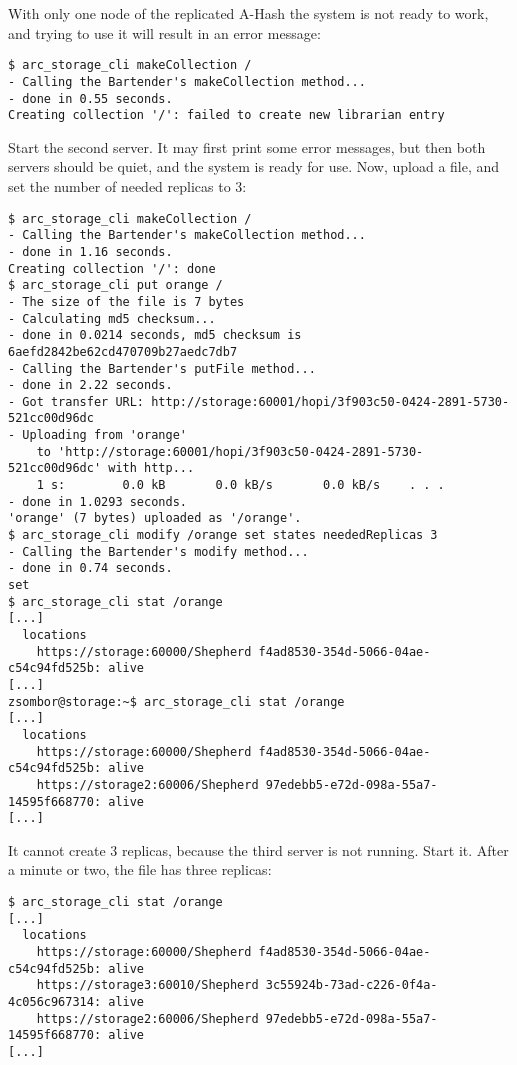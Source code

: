 \documentclass{article}
\begin{document}
With only one node of the replicated A-Hash the system is not ready to work, and trying to use it will result in an error message:
\begin{verbatim}
$ arc_storage_cli makeCollection /
- Calling the Bartender's makeCollection method...
- done in 0.55 seconds.
Creating collection '/': failed to create new librarian entry
\end{verbatim}

Start the second server. It may first print some error messages, but then both servers should be quiet, and the system is ready for use. Now, upload a file, and set the number of needed replicas to 3:

\begin{verbatim}
$ arc_storage_cli makeCollection /
- Calling the Bartender's makeCollection method...
- done in 1.16 seconds.
Creating collection '/': done
$ arc_storage_cli put orange /
- The size of the file is 7 bytes
- Calculating md5 checksum...
- done in 0.0214 seconds, md5 checksum is 6aefd2842be62cd470709b27aedc7db7
- Calling the Bartender's putFile method...
- done in 2.22 seconds.
- Got transfer URL: http://storage:60001/hopi/3f903c50-0424-2891-5730-521cc00d96dc
- Uploading from 'orange'
    to 'http://storage:60001/hopi/3f903c50-0424-2891-5730-521cc00d96dc' with http...
    1 s:        0.0 kB       0.0 kB/s       0.0 kB/s    . . .       
- done in 1.0293 seconds.
'orange' (7 bytes) uploaded as '/orange'.
$ arc_storage_cli modify /orange set states neededReplicas 3
- Calling the Bartender's modify method...
- done in 0.74 seconds.
set
$ arc_storage_cli stat /orange
[...]
  locations
    https://storage:60000/Shepherd f4ad8530-354d-5066-04ae-c54c94fd525b: alive
[...]
zsombor@storage:~$ arc_storage_cli stat /orange
[...]
  locations
    https://storage:60000/Shepherd f4ad8530-354d-5066-04ae-c54c94fd525b: alive
    https://storage2:60006/Shepherd 97edebb5-e72d-098a-55a7-14595f668770: alive
[...]    
\end{verbatim}

It cannot create 3 replicas, because the third server is not running. Start it. After a minute or two, the file has three replicas:

\begin{verbatim}
$ arc_storage_cli stat /orange
[...]
  locations
    https://storage:60000/Shepherd f4ad8530-354d-5066-04ae-c54c94fd525b: alive
    https://storage3:60010/Shepherd 3c55924b-73ad-c226-0f4a-4c056c967314: alive
    https://storage2:60006/Shepherd 97edebb5-e72d-098a-55a7-14595f668770: alive
[...]
\end{verbatim}
\end{document}
